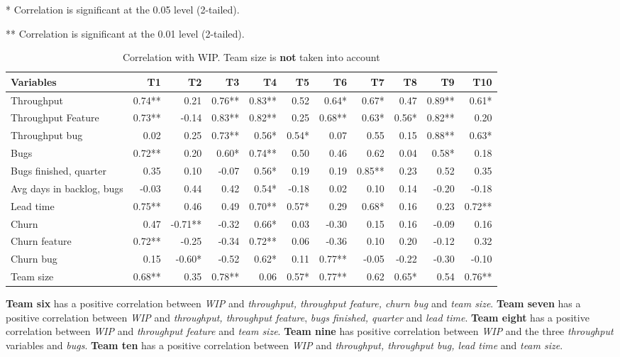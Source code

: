\documentclass[UKenglish]{ifimaster}  %
\begin{document}
\begin{table}[H]
 \caption{Correlation with WIP.  Team size is \textbf{not} taken into account}
  \centerline {* Correlation is significant at the 0.05 level (2-tailed).}
\centerline{** Correlation is significant at the 0.01 level (2-tailed).}
 \begin{adjustwidth}{-2cm}{}
 \centering
 \begin{tabular}{|l|r|r|r|r|r|r|r|r|r|r|}
\hline
 \textbf{Variables} & \bf{T1} & \bf{T2} & \bf{T3} & \bf{T4} & \bf{T5} & \bf{T6} & \bf{T7} & \bf{T8} & \bf{T9} & \bf{T10}\\ \hline
 Throughput  & 0.74** & 0.21 & 0.76** & 0.83** & 0.52 & 0.64* & 0.67* & 0.47 & 0.89** & 0.61* \\ \hline
 Throughput Feature  & 0.73** & -0.14 & 0.83** & 0.82** & 0.25 & 0.68** & 0.63* & 0.56* & 0.82** & 0.20 \\ \hline
 Throughput bug  & 0.02 & 0.25 & 0.73** & 0.56* & 0.54* & 0.07 & 0.55 & 0.15 & 0.88** & 0.63* \\ \hline
 Bugs  & 0.72** & 0.20 & 0.60* & 0.74** & 0.50 & 0.46 & 0.62 & 0.04 & 0.58* & 0.18 \\ \hline
 Bugs finished, quarter  & 0.35 & 0.10 & -0.07 & 0.56* & 0.19 & 0.19 & 0.85** & 0.23 & 0.52 & 0.35 \\ \hline
 Avg days in backlog, bugs  & -0.03 & 0.44 & 0.42 & 0.54* & -0.18 & 0.02 & 0.10 & 0.14 & -0.20 & -0.18 \\ \hline
 Lead time  & 0.75** & 0.46 & 0.49 & 0.70** & 0.57* & 0.29 & 0.68* & 0.16 & 0.23 & 0.72** \\ \hline
 Churn  & 0.47 & -0.71** & -0.32 & 0.66* & 0.03 & -0.30 & 0.15 & 0.16 & -0.09 & 0.16 \\ \hline
 Churn feature  & 0.72** & -0.25 & -0.34 & 0.72** & 0.06 & -0.36 & 0.10 & 0.20 & -0.12 & 0.32 \\ \hline
 Churn bug  & 0.15 & -0.60* & -0.52 & 0.62* & 0.11 & 0.77** & -0.05 & -0.22 & -0.30 & -0.10 \\ \hline
 Team size  & 0.68** & 0.35 & 0.78** & 0.06 & 0.57* & 0.77** & 0.62 & 0.65* & 0.54 & 0.76**\\ \hline
\end{tabular}
\label{corr:WIP}

\end{adjustwidth}
\end{table}

\textbf{Team six} has a positive correlation between \textit{WIP} and \textit{throughput, throughput feature, churn bug} and \textit{team size}. \textbf{Team seven} has a positive correlation between \textit{WIP} and \textit{throughput, throughput feature}, \textit{bugs finished, quarter} and \textit{lead time}. \textbf{Team eight} has a positive correlation between \textit{WIP} and \textit{throughput feature} and \textit{team size}. \textbf{Team nine} has positive correlation between \textit{WIP} and the three \textit{throughput} variables and \textit{bugs}. \textbf{Team ten} has a positive correlation between \textit{WIP} and \textit{throughput, throughput bug, lead time} and \textit{team size}. 
\end{document}
